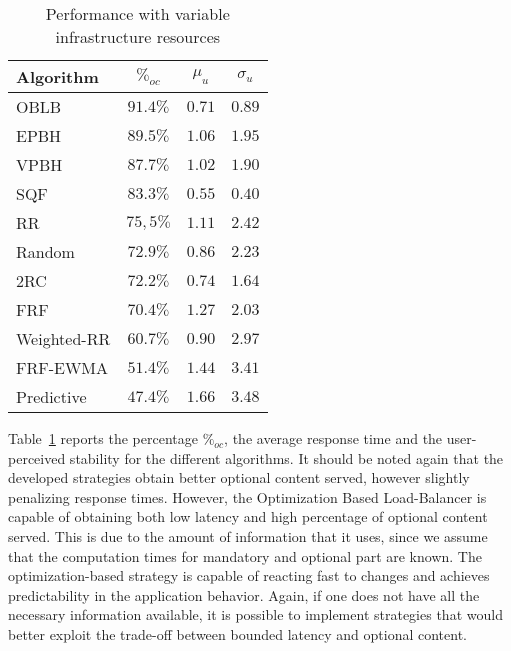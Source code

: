 \begin{table}
\centering
\caption{Performance with variable infrastructure resources}
\label{tab:resourcechanges-performance}
\begin{tabular}{l c c c}
\hline
Algorithm   & $\%_{oc}$ & $\mu_u$ & $\sigma_u$ \\
\hline
OBLB        & $\mathbf{91.4\%}$ & $0.71$          & $0.89$ \\
EPBH        & $89.5\%$          & $1.06$          & $1.95$ \\
VPBH        & $87.7\%$          & $1.02$          & $1.90$ \\
SQF         & $83.3\%$          & $\mathbf{0.55}$ & $\mathbf{0.40}$ \\
RR          & $75,5\%$          & $1.11$          & $2.42$ \\
Random      & $72.9\%$          & $0.86$          & $2.23$ \\
2RC         & $72.2\%$          & $0.74$          & $1.64$ \\
FRF         & $70.4\%$          & $1.27$          & $2.03$ \\
Weighted-RR & $60.7\%$          & $0.90$          & $2.97$ \\
FRF-EWMA    & $51.4\%$          & $1.44$          & $3.41$ \\
Predictive  & $47.4\%$          & $1.66$          & $3.48$ \\
\hline
\end{tabular}
\vspace{-4mm}
\end{table}

Table~\ref{tab:resourcechanges-performance} reports the percentage
$\%_{oc}$, the average response time and the user-perceived stability
for the different algorithms. It should be noted again that the
developed strategies obtain better optional content served, however
slightly penalizing response times. However, the Optimization Based
Load-Balancer is capable of obtaining both low latency and high
percentage of optional content served. This is due to the amount of
information that it uses, since we assume that the computation times
for mandatory and optional part are known. The optimization-based
strategy is capable of reacting fast to changes and achieves
predictability in the application behavior. Again, if one does not
have all the necessary information available, it is possible to
implement strategies that would better exploit the trade-off between
bounded latency and optional content.
